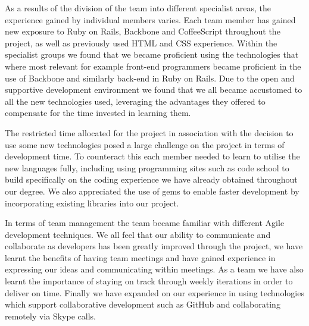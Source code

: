 		As a results of the division of the team into different specialist areas, the experience gained by individual members varies. Each team member has gained new exposure to Ruby on Rails, Backbone and CoffeeScript throughout the project, as well as previously used HTML and CSS experience. Within the specialist groups we found that we became proficient using the technologies that where most relevant for example front-end programmers became proficient in the use of Backbone and similarly back-end in Ruby on Rails. Due to the open and supportive development environment we found that we all became accustomed to all the new technologies used, leveraging the advantages they offered to compensate for the time invested in learning them.

		The restricted time allocated for the project in association with the decision to use some new technologies posed a large challenge on the project in terms of development time. To counteract this each member needed to learn to utilise the new languages fully, including using programming sites such as code school to build specifically on the coding experience we have already obtained throughout our degree. We also appreciated the use of gems to enable faster development by incorporating existing libraries into our project. 

		In terms of team management the team became familiar with different Agile development techniques. We all feel that our ability to communicate and collaborate as developers has been greatly improved through the project, we have learnt the benefits of having team meetings and have gained experience in expressing our ideas and communicating within meetings. As a team we have also learnt the importance of staying on track through weekly iterations in order to deliver on time. Finally we have expanded on our experience in using technologies which support collaborative development such as GitHub and collaborating remotely via Skype calls.
